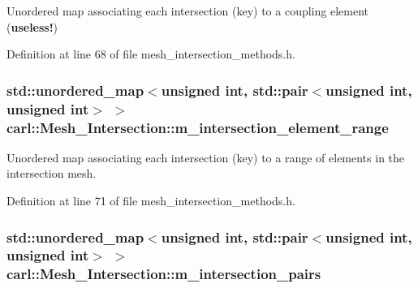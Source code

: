 Unordered map associating each intersection (key) to a coupling element ({\bfseries useless!}) 



Definition at line 68 of file mesh\+\_\+intersection\+\_\+methods.\+h.

\hypertarget{classcarl_1_1_mesh___intersection_adcbc0fb898aa287c2ff2a13693daf572}{}
\subsubsection[{m\+\_\+intersection\+\_\+element\+\_\+range}]{\setlength{\rightskip}{0pt plus 5cm}std\+::unordered\+\_\+map$<$unsigned int, std\+::pair$<$unsigned int, unsigned int$>$ $>$ carl\+::\+Mesh\+\_\+\+Intersection\+::m\+\_\+intersection\+\_\+element\+\_\+range\hspace{0.3cm}{\ttfamily [protected]}}\label{classcarl_1_1_mesh___intersection_adcbc0fb898aa287c2ff2a13693daf572}


Unordered map associating each intersection (key) to a range of elements in the intersection mesh. 



Definition at line 71 of file mesh\+\_\+intersection\+\_\+methods.\+h.

\hypertarget{classcarl_1_1_mesh___intersection_a06a4d0d633bf58594fee6e35ebbc1b97}{}
\subsubsection[{m\+\_\+intersection\+\_\+pairs}]{\setlength{\rightskip}{0pt plus 5cm}std\+::unordered\+\_\+map$<$unsigned int, std\+::pair$<$unsigned int, unsigned int$>$ $>$ carl\+::\+Mesh\+\_\+\+Intersection\+::m\+\_\+intersection\+\_\+pairs\hspace{0.3cm}{\ttfamily [protected]}}\label{classcarl_1_1_mesh___intersection_a06a4d0d633bf58594fee6e35ebbc1b97}


